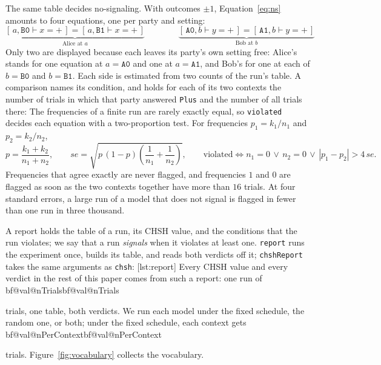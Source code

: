 \documentclass[11pt]{article}
\makeatletter
\newcommand{\hs}{\lstinline[style=hask,basicstyle=\ttfamily,frame=none]}
\newcommand{\val}[1]{\ifcsname bf@val@#1\endcsname\csname bf@val@#1\endcsname
  \else\PackageError{paper}{No value #1 in generated/values.tex}{}\fi}
\newcommand{\pr}[2]{[\,#1 \vdash #2\,]}
\newcommand{\tA}[1]{\texttt{A#1}}
\newcommand{\tB}[1]{\texttt{B#1}}
\newcommand{\xp}{x{=}{+}}
\newcommand{\yp}{y{=}{+}}
\makeatother
\begin{document}
The same table decides no-signaling. With outcomes $\pm1$, Equation~\eqref{eq:ns} amounts to four equations, one per party and setting:
\begin{equation}\label{eq:four}
  \underbrace{\pr{a, \tB0}{\xp} = \pr{a, \tB1}{\xp}}_{\text{Alice at } a}
  \qquad\qquad
  \underbrace{\pr{\tA0, b}{\yp} = \pr{\tA1, b}{\yp}}_{\text{Bob at } b}
\end{equation}
Only two are displayed because each leaves its party's own setting free: Alice's stands for one equation at $a = \tA0$ and one at $a = \tA1$, and Bob's for one at each of $b = \tB0$ and $b = \tB1$. Each side is estimated from two counts of the run's table. A comparison names its condition, and holds for each of its two contexts the number of trials in which that party answered \hs|Plus| and the number of all trials there:
The frequencies of a finite run are rarely exactly equal, so \hs|violated| decides each equation with a two-proportion test. For frequencies $p_1 = k_1 / n_1$ and $p_2 = k_2 / n_2$,
\[
  p = \frac{k_1 + k_2}{n_1 + n_2}, \qquad
  \mathit{se} = \sqrt{p\,(1 - p) \left(\frac{1}{n_1} + \frac{1}{n_2}\right)}, \qquad
  \text{violated} \iff n_1 = 0 \,\lor\, n_2 = 0 \,\lor\, |p_1 - p_2| > 4\,\mathit{se}.
\]
Frequencies that agree exactly are never flagged, and frequencies $1$ and $0$ are flagged as soon as the two contexts together have more than $16$ trials. At four standard errors, a large run of a model that does not signal is flagged in fewer than one run in three thousand.

A report holds the table of a run, its CHSH value, and the conditions that the run violates; we say that a run \emph{signals} when it violates at least one. \hs|report| runs the experiment once, builds its table, and reads both verdicts off it; \hs|chshReport| takes the same arguments as \hs|chsh|:
[lst:report]
Every CHSH value and every verdict in the rest of this paper comes from such a report: one run of \val{nTrials} trials, one table, both verdicts. We run each model under the fixed schedule, the random one, or both; under the fixed schedule, each context gets \val{nPerContext} trials. Figure~\ref{fig:vocabulary} collects the vocabulary.
\end{document}
